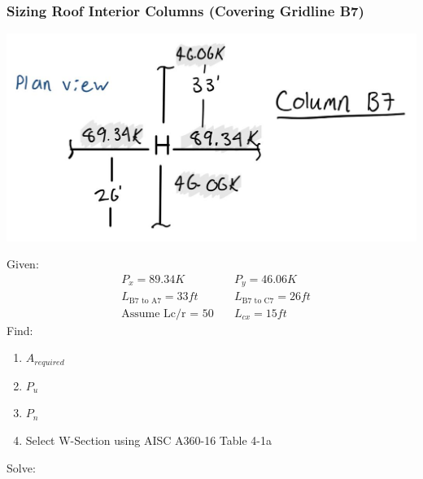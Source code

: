 \documentclass{report} %
\begin{document}
\subsubsection*{Sizing Roof Interior Columns (Covering Gridline B7)}
\begin{center}
    \includegraphics[scale=0.25]{RoofColumn_B7}
\end{center}
Given:
\begin{equation*}
    \begin{aligned}
        &P_x = 89.34K \quad &P_y = 46.06K \\
        &L_{\text{B7 to A7}} = 33ft \quad &L_{\text{B7 to C7}} = 26ft \\
        &\text{Assume Lc/r = 50} \quad &L_{cx} = 15ft
    \end{aligned}
\end{equation*}
Find:
\begin{enumerate}
    \item $A_{required}$
    \item $P_u$
    \item $P_n$
    \item Select W-Section using AISC A360-16 Table 4-1a
\end{enumerate}
Solve:
\end{document}
